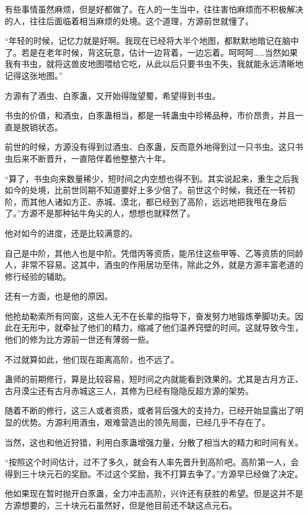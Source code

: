\begin{this_body}
有些事情虽然麻烦，但是好都做了。在人的一生当中，往往害怕麻烦而不积极解决的人，往往后面临着相当麻烦的处境。这个道理，方源前世就懂了。

“年轻的时候，记忆力就是好啊。我现在已经将大半个地图，都默默地暗记在脑中了。若是在老年时候，背这玩意，估计一边背着，一边忘着。呵呵呵……当然如果我有书虫，就将这兽皮地图喂给它吃，从此以后只要书虫不失，我就能永远清晰地记得这张地图。”

方源有了酒虫、白豕蛊，又开始得陇望蜀，希望得到书虫。

书虫的价值，和酒虫，白豕蛊相当，都是一转蛊虫中珍稀品种，市价昂贵，并且一直是脱销状态。

前世的时候，方源没有得到过酒虫、白豕蛊，反而意外地得到过一只书虫。这只书虫后来不断晋升，一直陪伴着他整整六十年。

“算了，书虫向来数量稀少，短时间之内空想也得不到。其实说起来，重生之后我如今的处境，比前世同期不知道要好上多少倍了。前世这个时候，我还在一转初阶，而其他人诸如方正、赤城、漠北，都已经到了高阶，远远地把我甩在身后了。”方源不是那种钻牛角尖的人，想想也就释然了。

他对如今的进度，还是比较满意的。

自己是中阶，其他人也是中阶。凭借丙等资质，能吊住这些甲等、乙等资质的同龄人，非常不容易。这其中，酒虫的作用居功至伟，除此之外，就是方源丰富老道的修行经验的辅助。

还有一方面，也是他的原因。

他抢劫勒索所有同窗，这些人无不在长辈的指导下，奋发努力地锻炼拳脚功夫。因此在无形中，就牵扯了他们的精力，缩减了他们温养窍壁的时间。这就导致今生，他们的修为比方源前一世还有薄弱一些。

不过就算如此，他们现在距离高阶，也不远了。

蛊师的前期修行，算是比较容易，短时间之内就能看到效果的。尤其是古月方正、古月漠尘还有古月赤城这三人，其修为已经有隐隐反超方源的架势。

随着不断的修行，这三人或者资质，或者背后强大的支持力，已经开始显露出了明显的优势。方源利用酒虫，艰难营造出的领先局面，已经几乎不存在了。

当然，这也和他近狩猎，利用白豕蛊增强力量，分散了相当大的精力和时间有关。

“按照这个时间估计，过不了多久，就会有人率先晋升到高阶吧。高阶第一人，会得到三十块元石的奖励。不过这个奖励，我不打算去争了。”方源早已经做了决定。

他如果现在暂时抛开白豕蛊，全力冲击高阶，兴许还有获胜的希望。但是这并不是方源想要的，三十块元石虽然好，但是他目前还不缺这点元石。


\end{this_body}
